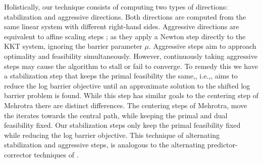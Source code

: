 \documentclass{article}
\begin{document}
Holistically, our technique consists of computing two types of directions: stabilization and aggressive directions. Both directions are computed from the same linear system with different right-hand sides. Aggressive directions are equivalent to affine scaling steps \cite{mehrotra1992implementation}; as they apply a Newton step directly to the KKT system, ignoring the barrier parameter $\mu$. Aggressive steps aim to approach optimality and feasibility simultaneously. However, continuously taking aggressive steps may cause the algorithm to stall or fail to converge. To remedy this we have a stabilization step that keeps the primal feasibility the same,, i.e.,, aims to reduce the log barrier objective until an approximate solution to the shifted log barrier problem is found. While this step has similar goals to the centering step of Mehrotra there are distinct differences. The centering steps of Mehrotra, move the iterates towards the central path, while keeping the primal and dual feasibility fixed. Our stabilization steps only keep the primal feasibility fixed while reducing the log barrier objective. This technique of alternating stabilization and aggressive steps, is analogous to the alternating predictor-corrector techniques of \citet*{mizuno1993adaptive}.


\end{document}
